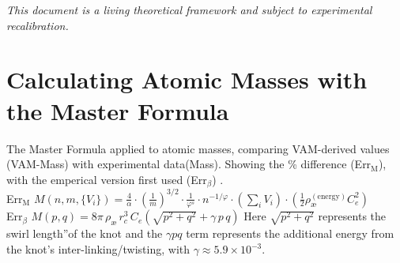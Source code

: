 \documentclass[12pt]{article}
\begin{document}
\textit{This document is a living theoretical framework and subject to experimental recalibration.}

  
  

\appendix
      \section{Calculating Atomic Masses with the Master Formula}\label{sec:AtomicMasses}
  The Master Formula applied to atomic masses, comparing VAM-derived values (VAM-Mass) with experimental data(Mass). Showing the \% difference (Err$_\text{M}$), with the emperical version first used (Err$_\beta$)  .   \\ Err$_\text{M}$ \( M(n, m, \{V_i\}) = \frac{4}{\alpha} \cdot \left( \frac{1}{m} \right)^{3/2} \cdot \frac{1}{\varphi^s} \cdot n^{-1/\varphi} \cdot \left( \sum_i V_i \right) \cdot \left( \frac{1}{2} \rho_\text{\ae}^{(\text{energy})} C_e^2 \right) \)\\
  Err$_\beta$ \(  M(p,q) = 8\pi\,\rho_{\text{\ae}}\,r_c^3\,C_e \left(\sqrt{p^2 + q^2} + \gamma\, p\,q\right) \)
  Here $\sqrt{p^2+q^2}$ represents the \grqq swirl length\textquotedblright of the knot and the $\gamma p q$ term represents the additional energy from the knot's inter-linking/twisting, with $\gamma \approx 5.9\times10^{-3}$.
\end{document}
